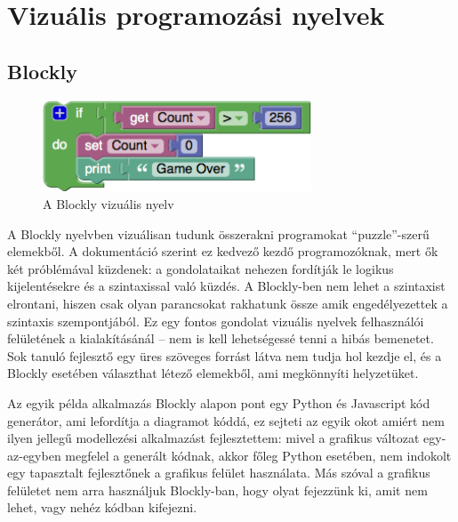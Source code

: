 


\section{Vizuális programozási nyelvek}

\subsection{Blockly}

\begin{figure}[!ht]
\centering
\includegraphics[width=8cm,keepaspectratio]{figures/blockly.png}
\caption{A Blockly vizuális nyelv}
\label{fig:blockly}
\end{figure}

A Blockly nyelvben vizuálisan tudunk összerakni programokat ``puzzle''-szerű elemekből. A dokumentáció szerint ez kedvező kezdő programozóknak, mert ők két próblémával küzdenek: a gondolataikat nehezen fordítják le logikus kijelentésekre és a szintaxissal való küzdés. A Blockly-ben nem lehet a szintaxist elrontani, hiszen csak olyan parancsokat rakhatunk össze amik engedélyezettek a szintaxis szempontjából. Ez egy fontos gondolat vizuális nyelvek felhasználói felületének a kialakításánál -- nem is kell lehetségessé tenni a hibás bemenetet. Sok tanuló fejlesztő egy üres szöveges forrást látva nem tudja hol kezdje el, és a Blockly esetében választhat létező elemekből, ami megkönnyíti helyzetüket\cite{blocklyref}.

Az egyik példa alkalmazás Blockly alapon pont egy Python és Javascript kód generátor, ami lefordítja a diagramot kóddá, ez sejteti az egyik okot amiért nem ilyen jellegű modellezési alkalmazást fejlesztettem: mivel a grafikus változat egy-az-egyben megfelel a generált kódnak, akkor főleg Python esetében, nem indokolt egy tapasztalt fejlesztőnek a grafikus felület használata. Más szóval a grafikus felületet nem arra használjuk Blockly-ban, hogy olyat fejezzünk ki, amit nem lehet, vagy nehéz kódban kifejezni. 

